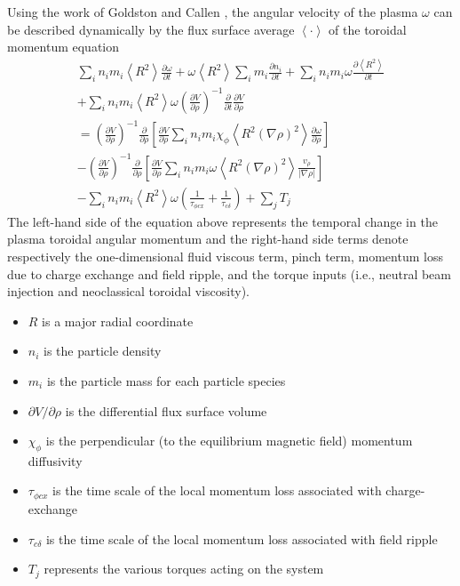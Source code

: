 \documentclass[12pt,lot, lof]{puthesis}
\begin{document}
Using the work of Goldston \cite{Goldston86}  and Callen  \cite{Callen09}, the angular velocity of the plasma $\omega$ can be described dynamically by the flux surface average $\left<\cdot\right>$ of the toroidal momentum equation 
\begin{multline}
  \sum_i n_i m_i \left<R^2\right> \frac{\partial \omega}{\partial t}
  + \omega \left<R^2\right> \sum_i m_i \frac{\partial n_i}{\partial t} 
  + \sum_i n_i m_i \omega \frac{\partial \left<R^2\right>}{\partial t} \\
  + \sum_i n_i m_i \left<R^2\right> \omega \left( \frac{\partial V}{\partial\rho}\right)^{-1} \frac{\partial}{\partial t} \frac{\partial V}{\partial \rho} \\
  = \left( \frac{\partial V}{\partial\rho}\right)^{-1}\frac{\partial}{\partial \rho} \left[\frac{\partial V}{\partial \rho}\sum_i n_i m_i \chi_\phi \left< R^2 (\nabla \rho)^2\right> \frac{\partial\omega}{\partial\rho}\right] \\
  - \left( \frac{\partial V}{\partial\rho}\right)^{-1}\frac{\partial}{\partial \rho} \left[\frac{\partial V}{\partial \rho}\sum_i n_i m_i \omega \left< R^2 (\nabla \rho)^2\right> \frac{v_\rho}{|\nabla\rho|}\right] \\
  - \sum_i n_i m_i \left< R^2\right> \omega \left( \frac{1}{\tau_{\phi cx}} + \frac{1}{\tau_{c\delta}}\right) + \sum_j T_j
	\label{model1}
\end{multline}
The left-hand side of the equation above represents the temporal change in the plasma toroidal angular momentum and the right-hand side terms denote respectively the one-dimensional fluid viscous term, pinch term, momentum loss due to charge exchange and field ripple, and the torque inputs (i.e., neutral beam injection and neoclassical toroidal viscosity).
\begin{itemize}
\item   $R$ is a major radial coordinate 
\item $n_i$ is the particle density 
\item $m_i$ is the particle mass for each particle species
\item $\partial V/\partial\rho$ is the differential flux surface volume
\item $\chi_\phi$ is the perpendicular (to the equilibrium magnetic field) momentum diffusivity
\item  $\tau_{\phi c x}$ is the time scale of the local momentum loss associated with charge-exchange  
\item  $\tau_{c\delta}$ is the time scale of the local momentum loss associated with field ripple
\item $T_j$ represents the various torques acting on the system
\end{itemize}
\end{document}
